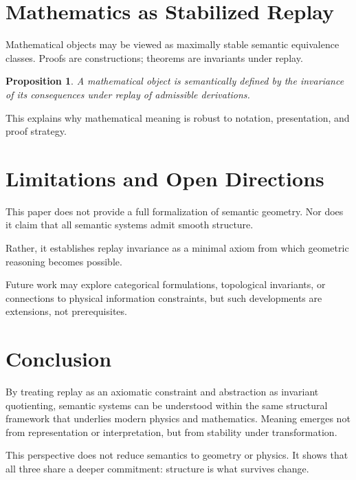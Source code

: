 \documentclass[11pt]{article}
\newtheorem{proposition}{Proposition}[section]
\begin{document}
\section{Mathematics as Stabilized Replay}

Mathematical objects may be viewed as maximally stable semantic equivalence classes. Proofs are constructions; theorems are invariants under replay.

\begin{proposition}
A mathematical object is semantically defined by the invariance of its consequences under replay of admissible derivations.
\end{proposition}

This explains why mathematical meaning is robust to notation, presentation, and proof strategy.

\section{Limitations and Open Directions}

This paper does not provide a full formalization of semantic geometry. Nor does it claim that all semantic systems admit smooth structure.

Rather, it establishes replay invariance as a minimal axiom from which geometric reasoning becomes possible.

Future work may explore categorical formulations, topological invariants, or connections to physical information constraints, but such developments are extensions, not prerequisites.

\section{Conclusion}

By treating replay as an axiomatic constraint and abstraction as invariant quotienting, semantic systems can be understood within the same structural framework that underlies modern physics and mathematics. Meaning emerges not from representation or interpretation, but from stability under transformation.

This perspective does not reduce semantics to geometry or physics. It shows that all three share a deeper commitment: structure is what survives change.
\end{document}
